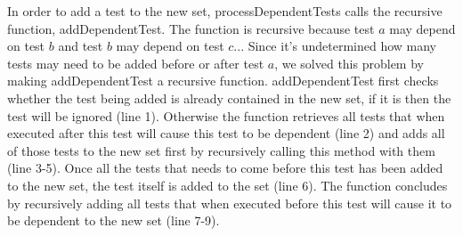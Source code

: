 In order to add a test to the new set, processDependentTests calls
the recursive function, addDependentTest. The function is recursive
because test $\mathit{a}$ may depend on test $\mathit{b}$ and test
$\mathit{b}$ may depend on test $\mathit{c}$... Since it's
undetermined how many tests may need to be added before or after
test $\mathit{a}$, we solved this problem by making addDependentTest
a recursive function. addDependentTest first checks whether the test
being added is already contained in the new set, if it is then the
test will be ignored (line 1). Otherwise the function retrieves all
tests that when executed after this test will cause this test to be
dependent (line 2) and adds all of those tests to the new set first
by recursively calling this method with them (line 3-5). Once all
the tests that needs to come before this test has been added to
the new set, the test itself is added to the set (line 6). The
function concludes by recursively adding all tests that when executed
before this test will cause it to be dependent to the new set (line 7-9).     














